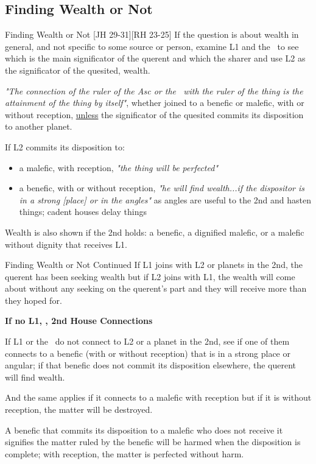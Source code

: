 \subsection{Finding Wealth or Not}
\begin{frame}[t]{Finding Wealth or Not [JH 29-31][RH 23-25]}
If the question is about wealth in general, and not specific to some source or person, examine L1 and the \Moon\ to see which is the main significator of the querent and which the sharer and use L2 as the significator of the quesited, wealth.

\begin{block}{}
\textsl{"The connection of the ruler of the Asc or the \Moon\ with the ruler of the thing is the attainment of the thing by itself"}, whether joined to a benefic or malefic, with or without reception, \underline{unless} the significator of the quesited commits its disposition to another planet.\footnotemark[1]
\end{block}

If L2 commits its disposition to:
\begin{itemize}
\item a malefic, with reception, \textsl{"the thing will be perfected"}
\item a benefic, with or without reception, \textsl{"he will find wealth...if the dispositor is in a strong [place] or in the angles"} as angles are useful to the 2nd and hasten things; cadent houses delay things
\end{itemize}

Wealth is also shown if the 2nd holds: a benefic, a dignified malefic, or a malefic without dignity that receives L1.

\end{frame}
\begin{frame}[t]{Finding Wealth or Not Continued}
If L1 joins with L2 or planets in the 2nd, the querent has been seeking wealth but if L2 joins with L1, the wealth will come about without any seeking on the querent's part and they will receive more than they hoped for.

\textbf{If no L1, \Moon, 2nd House Connections}

If L1 or the \Moon\ do not connect to L2 or a planet in the 2nd, see if one of them connects to a benefic (with or without reception) that is in a strong place or angular; if that benefic does not commit its disposition elsewhere, the querent will find wealth. 

And the same applies if it connects to a malefic with reception but if it is without reception, the matter will be destroyed.

\begin{block}{}
A benefic that commits its disposition to a malefic who does not receive it signifies the matter ruled by the benefic will be harmed when the disposition is complete; with reception, the matter is perfected without harm.
\end{block}






\end{frame}